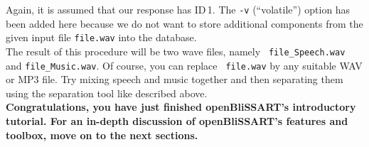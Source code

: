 Again, it is assumed that our response has ID\,1. The {\tt -v} (``volatile'')
option has been added here because we do not want to store additional components
from the given input file \verb|file.wav| into the database.\\

The result of this procedure will be two wave files, namely {\tt
  file\_Speech.wav} and {\tt file\_Music.wav}. Of course, you can replace {\tt
  file.wav} by any suitable WAV or MP3 file. Try mixing speech and music
together and then separating them using the separation tool like described above.\\

\noindent \textbf{Congratulations, you have just finished openBliSSART's
  introductory tutorial. For an in-depth discussion of openBliSSART's features
  and toolbox, move on to the next sections.}
